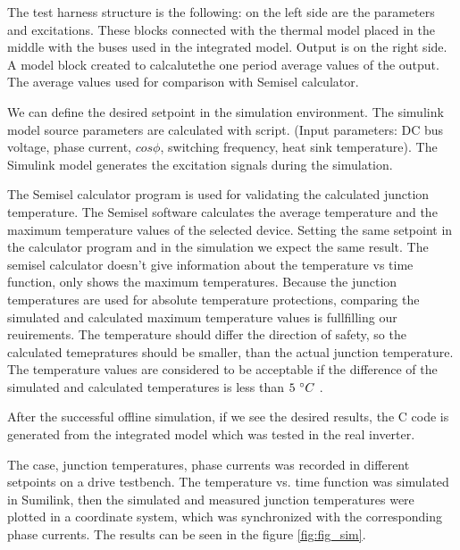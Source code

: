 The test harness structure is the following: on the left side are the parameters and excitations. These blocks connected with the thermal model placed in the middle with the buses used in the integrated model. Output is on the right side. A model block created to calcalutethe one period average values of the output. The average values used for comparison with Semisel calculator.

We can define the desired setpoint in the simulation environment. The simulink model source parameters are calculated with script. (Input parameters: DC bus voltage, phase current, $cos\phi{}$, switching frequency, heat sink temperature). The Simulink model generates the excitation signals during the simulation.

The Semisel calculator program is used for validating the calculated junction temperature. The Semisel software calculates the average temperature and the maximum temperature values of the selected device. Setting the same setpoint in the calculator program and in the simulation we expect the same result. The  semisel calculator doesn’t give information about the temperature vs time function, only shows the maximum temperatures. Because the junction temperatures are used for absolute temperature protections, comparing the simulated and calculated maximum temperature values is fullfilling our reuirements. The temperature should differ the direction of safety, so the calculated temepratures should be smaller, than the actual junction temperature. The temperature values are considered to be acceptable if the difference of the simulated and calculated temperatures is less than $5\ \degree{}C$ .

After the successful offline simulation, if we see the desired results, the C code is generated from the integrated model which was tested in the real inverter.

The case, junction temperatures, phase currents was recorded in different setpoints on a drive testbench. The temperature vs. time function was simulated in Sumilink, then the simulated and measured junction temperatures were  plotted in a coordinate system, which was synchronized with the corresponding phase currents. The results can be seen in the figure \ref{fig:fig_sim}.

